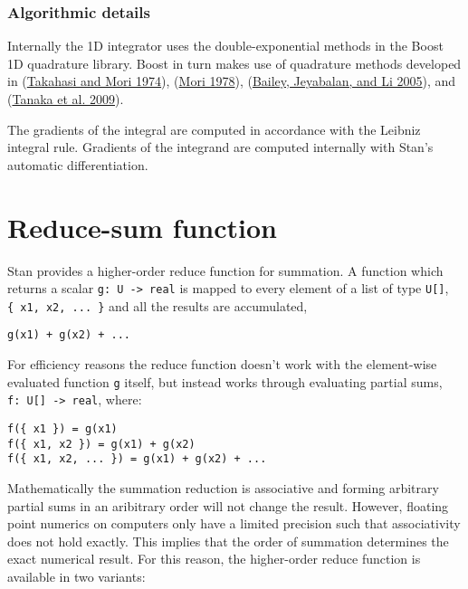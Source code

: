 \documentclass[
  10pt,
]{book}
\begin{document}
\hypertarget{algorithmic-details-1}{%
\subsubsection{Algorithmic details}\label{algorithmic-details-1}}

Internally the 1D integrator uses the double-exponential methods in the Boost 1D quadrature library. Boost in turn makes use of quadrature methods developed in (\protect\hyperlink{ref-Takahasi:1974}{Takahasi and Mori 1974}), (\protect\hyperlink{ref-Mori:1978}{Mori 1978}), (\protect\hyperlink{ref-Bailey:2005}{Bailey, Jeyabalan, and Li 2005}), and (\protect\hyperlink{ref-Tanaka:2009}{Tanaka et al. 2009}).

The gradients of the integral are computed in accordance with the Leibniz integral rule. Gradients of the integrand are computed internally with Stan's automatic differentiation.

\hypertarget{functions-reduce}{%
\section{Reduce-sum function}\label{functions-reduce}}

Stan provides a higher-order reduce function for summation. A function
which returns a scalar \texttt{g:\ U\ -\textgreater{}\ real} is mapped to every element of a
list of type \texttt{U{[}{]}}, \texttt{\{\ x1,\ x2,\ ...\ \}} and all the results are
accumulated,

\texttt{g(x1)\ +\ g(x2)\ +\ ...}

For efficiency reasons the reduce function doesn't work with the
element-wise evaluated function \texttt{g} itself, but instead works through
evaluating partial sums, \texttt{f:\ U{[}{]}\ -\textgreater{}\ real}, where:

\begin{verbatim}
f({ x1 }) = g(x1)
f({ x1, x2 }) = g(x1) + g(x2)
f({ x1, x2, ... }) = g(x1) + g(x2) + ...
\end{verbatim}

Mathematically the summation reduction is associative and forming
arbitrary partial sums in an aribitrary order will not change the
result. However, floating point numerics on computers only have
a limited precision such that associativity does not hold
exactly. This implies that the order of summation determines the exact
numerical result. For this reason, the higher-order reduce function is
available in two variants:
\end{document}
